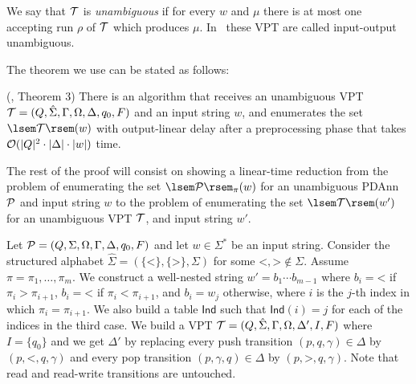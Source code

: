 We say that $\mathcal{T}$ is \emph{unambiguous} if for every $w$ and $\mu$ there is at most one accepting run $\rho$ of $\mathcal{T}$ which produces $\mu$. In~\cite{icdt2020nested} these VPT are called input-output unambiguous.

The theorem we use can be stated as follows:

\begin{theorem}{(\cite{icdt2020nested}, Theorem 3)}\label{eval:prep}
	There is an algorithm that receives an unambiguous VPT $\mathcal{T} = (Q, \hat{\Sigma}, \Gamma, \Omega, \Delta, q_0, F)$ and an input string $w$, and enumerates the set $\sem{\cT}(w)$ with output-linear delay after a preprocessing phase that takes $\mathcal{O}(|Q|^2 \cdot \vert\Delta\vert \cdot |w|)$ time.
\end{theorem}

The rest of the proof will consist on showing a linear-time reduction from the problem of enumerating the set $\sem{\cP}_{\pi}(w)$ for an unambiguous PDAnn $\mathcal{P}$ and input string $w$ to the problem of enumerating the set $\sem{\cT}(w')$ for an unambiguous VPT $\mathcal{T}$, and input string $w'$.

Let $\mathcal{P} = (Q, \Sigma, \Omega, \Gamma, \Delta, q_0, F)$ and let $w\in \Sigma^*$ be an input string.
Consider the structured alphabet $\hat{\Sigma} = (\{\texttt{<}\}, \{\texttt{>}\}, \Sigma)$ for some $\texttt{<}, \texttt{>}\not\in\Sigma$. Assume $\pi = \pi_1, \ldots, \pi_m$.
We construct a well-nested string $w' = b_1\cdots b_{m-1}$ where $b_i = 
\texttt{<}$ if $\pi_i > \pi_{i+1}$, $b_i = \texttt{<}$ if $\pi_i < \pi_{i+1}$, and $b_i  = w_j$ otherwise, where $i$ is the $j$-th index in which $\pi_i = \pi_{i+1}$.
We also build a table $\mathsf{Ind}$ such that $\mathsf{Ind}(i) = j$ for each of the indices in the third case.
We build a VPT $\mathcal{T} = (Q, \hat{\Sigma}, \Gamma, \Omega, \Delta', I, F)$ where $I = \{q_0\}$ and we get $\Delta'$ by replacing every push transition $(p, q, \gamma)\in \Delta$ by $(p, \texttt{<}, q, \gamma)$ and every pop transition $(p,\gamma,q)\in\Delta$ by $(p, \texttt{>}, q, \gamma)$. Note that read and read-write transitions are untouched.

